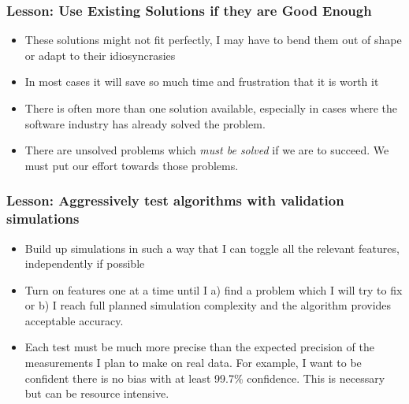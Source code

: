 \documentclass{beamer}
\begin{document}
\frame
{
    \frametitle{Lesson: Use Existing Solutions if they are Good Enough}


    \begin{itemize}

        \item These solutions might not fit perfectly, I may have to bend
            them out of shape or adapt to their idiosyncrasies

        \item In most cases it will save so much time and frustration that it
            is worth it

        \item There is often more than one solution available, especially in
            cases where the software industry has already solved the problem.

        \item There are unsolved problems which {\em must be solved} if we are
            to succeed.  We must put our effort towards those problems.

    \end{itemize}

}

\frame
{
    \frametitle{Lesson: Aggressively test algorithms with validation simulations}


    \begin{itemize}

        \item Build up simulations in such a way that I can toggle all the
            relevant features, independently if possible

        \item Turn on features one at a time until I a) find a problem which I
            will try to fix or b) I reach full planned simulation complexity
            and the algorithm provides acceptable accuracy.

        \item Each test must be much more precise than the expected precision
            of the measurements I plan to make on real data.  For example, I
            want to be confident there is no bias with at least 99.7\%
            confidence.  This is necessary but can be resource intensive.

    \end{itemize}

}
\end{document}
